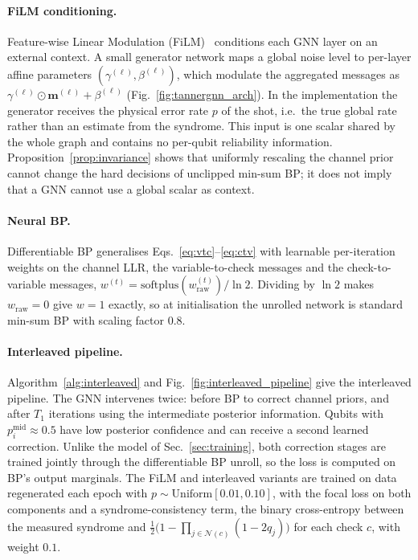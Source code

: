 \documentclass[a4paper,twocolumn,11pt,nopdfoutputerror]{quantumarticle}
\newcommand{\bvec}[1]{\mathbf{#1}}
\begin{document}
\paragraph{FiLM conditioning.} Feature-wise Linear Modulation
(FiLM)~\cite{Perez2018FiLM} conditions each GNN layer on an external
context. A small generator network maps a global noise level to per-layer
affine parameters $(\gamma^{(\ell)}, \beta^{(\ell)})$, which modulate the
aggregated messages as $\gamma^{(\ell)} \odot \bvec{m}^{(\ell)} +
\beta^{(\ell)}$ (Fig.~\ref{fig:tannergnn_arch}). In the implementation the
generator receives the physical error rate $p$ of the shot, i.e.\ the true
global rate rather than an estimate from the syndrome. This input is one
scalar shared by the whole graph and contains no per-qubit reliability
information. Proposition~\ref{prop:invariance} shows that uniformly
rescaling the channel prior cannot change the hard decisions of unclipped
min-sum BP; it does not imply that a GNN cannot use a global scalar as
context.

\paragraph{Neural BP.} Differentiable BP generalises
Eqs.~\eqref{eq:vtc}--\eqref{eq:ctv} with learnable per-iteration weights on
the channel LLR, the variable-to-check messages and the check-to-variable
messages, $w^{(t)} = \mathrm{softplus}(w_\mathrm{raw}^{(t)})/\ln 2$.
Dividing by $\ln 2$ makes $w_\mathrm{raw}=0$ give $w=1$ exactly, so at
initialisation the unrolled network is standard min-sum BP with scaling
factor 0.8.

\paragraph{Interleaved pipeline.} Algorithm~\ref{alg:interleaved} and
Fig.~\ref{fig:interleaved_pipeline} give the interleaved pipeline. The GNN
intervenes twice: before BP to correct channel priors, and after $T_1$
iterations using the intermediate posterior information. Qubits with
$p_i^\mathrm{mid} \approx 0.5$ have low posterior confidence and can
receive a second learned correction. Unlike the model of
Sec.~\ref{sec:training}, both correction stages are trained jointly
through the differentiable BP unroll, so the loss is computed on BP's
output marginals. The FiLM and interleaved variants are trained on data
regenerated each epoch with $p\sim\mathrm{Uniform}[0.01,0.10]$, with the
focal loss on both components and a syndrome-consistency term, the binary
cross-entropy between the measured syndrome and
$\tfrac12\bigl(1-\prod_{j\in\mathcal N(c)}(1-2q_j)\bigr)$ for each check
$c$, with weight $0.1$.
\end{document}
